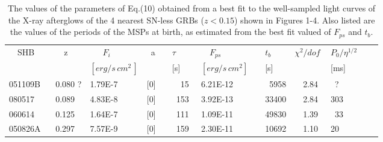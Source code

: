 \documentclass[twocolumn]{aastex61}
\begin{document}
\begin{table*}
\caption{The values of the parameters of Eq.(10) obtained 
from a best fit to the well-sampled light curves of the X-ray 
afterglows of the 4 nearest SN-less GRBs ($z<0.15$) shown in Figures 1-4. Also
listed are the values of the periods  of
the MSPs at birth, as estimated from the best fit valued of
$F_{ps}$ and $t_b$.}
\centering
\begin{tabular}{l l l l l l l l l l l}
\hline
\hline
~~SHB~~~&~~z~~~&~~~$F_i$~~~~&~a~&~$\tau$~~~~&~~$F_{ps}$~~&~$t_b$&$\chi^2/dof$&$P_0/\eta^{1/2}$\\
        &     &$[erg/s\,cm^2\,]$&        &   ~[s]~  &$[erg/s\,cm^2]$~& ~[s]~&   & [ms]\\
\hline
051109B  &0.080 ?&  1.79E-7~ & [0] & ~~~15  & 6.21E-12 & ~~5958 &~~2.84~& ~?~  \\
080517~  &0.089~ &  4.83E-8~ & [0] & ~~153  & 3.92E-13 & ~33400 &~~2.84~& 303  \\
060614~  &0.125~ &  1.64E-7~ & [0] & ~~111  & 1.09E-11 & ~49830 &~~1.39~& ~33  \\
050826A  &0.297~ &  7.57E-9~ & [0] & ~~159  & 2.30E-11 & ~10692&~~1.10~ &  20  \\

\hline
\end{tabular}
\end{table*}
\end{document}
